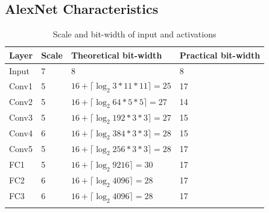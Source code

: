 \subsection{AlexNet Characteristics}
\begin{table}[H]
	\caption{Scale and bit-width of input and activations}
	\label{tab:scale-and-bit-width-of-input-and-activations}
	\centering
	\begin{tabular}{llll}
		\toprule
		\textbf{Layer} & \textbf{Scale} & \textbf{Theoretical bit-width} & \textbf{Practical bit-width}\\
		\midrule
			Input & 7 & 8 & 8\\
			Conv1 & 5 & $16 + \lceil \log_2 3 * 11 * 11 \rceil = 25 $ & 17\\
			Conv2 & 5 & $16 + \lceil \log_2 64 * 5 * 5 \rceil = 27$ & 14\\
			Conv3 & 5 & $16 + \lceil \log_2 192 * 3 * 3 \rceil = 27$ & 15\\
			Conv4 & 6 & $16 + \lceil \log_2 384 * 3 * 3 \rceil = 28$ & 15\\
			Conv5 & 5 & $16 + \lceil \log_2 256 * 3 * 3 \rceil = 28$ & 17\\
			FC1 & 5 & $16 + \lceil \log_2 9216 \rceil = 30$ & 17\\
			FC2 & 6 & $16 + \lceil \log_2 4096 \rceil = 28$ & 17\\
			FC3 & 6 & $16 + \lceil \log_2 4096 \rceil = 28$ & 17\\
		\bottomrule\\
	\end{tabular}
\end{table}
